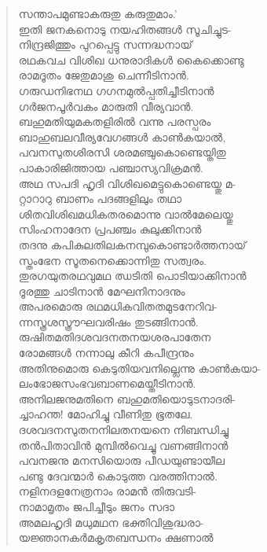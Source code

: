 \begin{verse}
സന്താപമുണ്ടാകരുതു കരുതുമാം.’\\
ഇതി ജനകനൊടു നയഹിതങ്ങള്‍ സൂചിച്ചുട-\\
നിന്ദ്രജിത്തും പുറപ്പെട്ടു സന്നദ്ധനായ്\\
രഥകവച വിശിഖ ധനുരാദികള്‍ കൈക്കൊണ്ടു\\
രാമദൂതം ജേതുമാശു ചെന്നീടിനാന്‍.\\
ഗരുഡനിഭനഥ ഗഗനമുല്‍പ്പതിച്ചീടിനാന്‍\\
ഗര്‍ജനപൂര്‍വകം മാരുതി വീര്യവാന്‍.\\
ബഹുമതിയുമകതളിരില്‍ വന്നു പരസ്പരം\\
ബാഹുബലവീര്യവേഗങ്ങള്‍ കാണ്‍കയാല്‍,\\
പവനസുതശിരസി ശരമഞ്ചുകൊണ്ടെയ്തിതു\\
പാകാരിജിത്തായ പഞ്ചാസ്യവിക്രമന്‍.\\
അഥ സപദി ഹൃദി വിശിഖമെട്ടുകൊണ്ടെയ്തു മ-\\
റ്റാറാറു ബാണം പദങ്ങളിലും തഥാ\\
ശിതവിശിഖമധികതരമൊന്നു വാല്‍മേലെയ്തു\\
സിംഹനാദേന പ്രപഞ്ചം കുലുക്കിനാന്‍\\
തദനു കപികുലതിലകനമ്പുകൊണ്ടാര്‍ത്തനായ്\\
സ്തംഭേന സൂതനെക്കൊന്നിതു സത്വരം.\\
തുരഗയുതരഥവുമഥ ഝടിതി പൊടിയാക്കിനാന്‍\\
ദൂരത്തു ചാടിനാന്‍ മേഘനിനാദനും\\
അപരമൊരു രഥമധികവിതതമുടനേറിവ-\\
ന്നസ്ത്രശസ്ത്രൗഘവരിഷം തുടങ്ങിനാന്‍.\\
രുഷിതമതിദശവദനതനയശരപാതേന\\
രോമങ്ങള്‍ നന്നാലു കീറി കപീന്ദ്രനും\\
അതിനുമൊരു കെടുതിയവനില്ലെന്നു കാണ്‍കയാ-\\
ലംഭോജസംഭവബാണമെയ്തീടിനാന്‍.\\
അനിലജനുമതിനെ ബഹുമതിയൊടുടനാദരി-\\
ച്ചാഹന്ത! മോഹിച്ചു വീണിതു ഭൂതലേ.\\
ദശവദനസുതനനിലതനയനെ നിബന്ധിച്ചു\\
തന്‍പിതാവിന്‍ മുമ്പില്‍വെച്ചു വണങ്ങിനാന്‍\\
പവനജനു മനസിയൊരു പീഡയുണ്ടായീല\\
പണ്ടു ദേവന്മാര്‍ കൊടുത്ത വരത്തിനാല്‍.\\
നളിനദളനേത്രനാം രാമന്‍ തിരുവടി-\\
നാമാമൃതം ജപിച്ചീടും ജനം സദാ\\
അമലഹൃദി മധുമഥന ഭക്തിവിശുദ്ധരാ-\\
യജ്ഞാനകര്‍മകൃതബന്ധനം ക്ഷണാല്‍\\

\end{verse}

